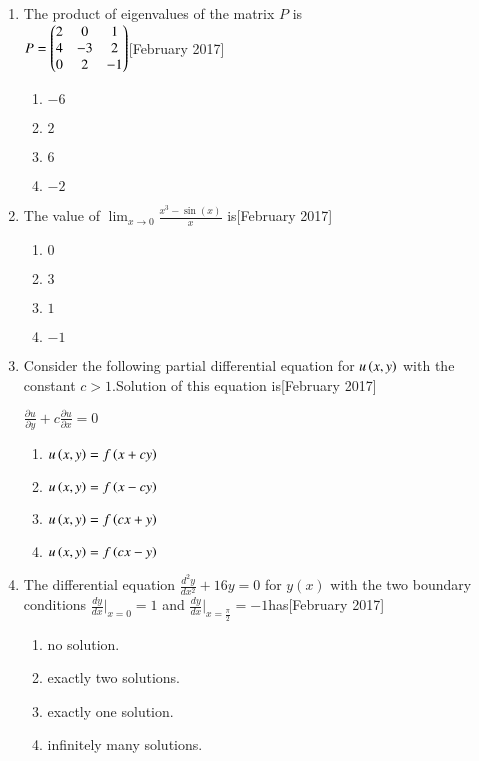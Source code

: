 \documentclass[journal]{IEEEtran}
\begin{document}
\begin{enumerate}
\item The product of eigenvalues of the matrix $P$ is \\
$P = \begin{pmatrix}2 & 0 & 1 \\ 4 & -3 & 2 \\ 0 & 2 & -1\end{pmatrix} $\hfill[February 2017]
\begin{enumerate}
    \item $-6$
    \item $2$
    \item $6$
    \item $-2$
\end{enumerate}
\item The value of $ \lim_{x \to 0} \frac{x^3 - \sin(x)}{x} $ is\hfill[February 2017]
\begin{enumerate}
    \item $0$
    \item $3$
    \item $1$
    \item $-1$
\end{enumerate}
\item Consider the following partial differential equation for  $u\left(x, y\right)$ with the \\ constant $c > 1$.Solution of this equation is\hfill[February 2017]
\begin{center}
$\frac{\partial u}{\partial y} + c \frac{\partial u}{\partial x} = 0$
\end{center}
\begin{enumerate}
    \item$ u\left(x, y\right) = f\left(x + cy\right)$
    \item$ u\left(x, y\right) = f\left(x - cy\right) $
    \item$ u\left(x, y\right) = f\left(cx + y\right) $
    \item$ u\left(x, y\right) = f\left(cx - y\right) $
\end{enumerate}
\item The differential equation $ \frac{d^2 y}{dx^2} + 16y = 0 $ for $y(x)$ with the two boundary conditions $\frac{dy}{dx}|_{x=0} = 1 $ and $\frac{dy}{dx}|_{x=\frac{\pi}{2}} = -1 $has\hfill[February 2017]
\begin{enumerate}
    \item no solution.
    \item exactly two solutions.
    \item exactly one solution.
    \item infinitely many solutions.
\end{enumerate}

\end{enumerate}
\end{document}
